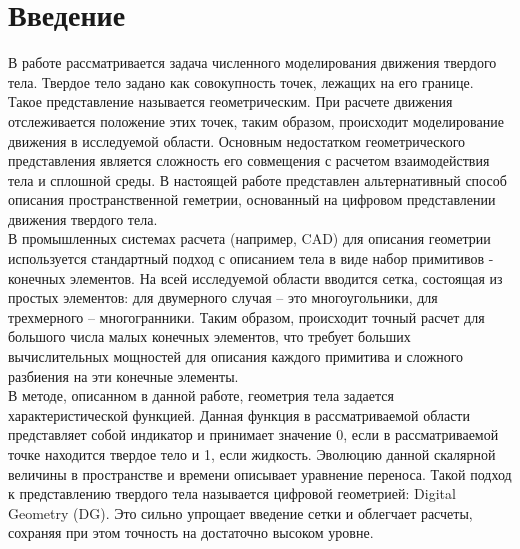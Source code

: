 \documentclass[12pt,a4paper]{article}
\begin{document}
\newpage
\tableofcontents


\newpage

\section{Введение}
В работе рассматривается задача численного моделирования движения твердого тела. Твердое тело задано как совокупность точек, лежащих на его границе. Такое представление называется геометрическим. При расчете движения отслеживается положение этих точек, таким образом, происходит моделирование движения в исследуемой области. Основным недостатком геометрического представления является сложность его совмещения с расчетом взаимодействия тела и сплошной среды. В настоящей работе представлен альтернативный способ описания пространственной геметрии, основанный на цифровом представлении движения твердого тела.\\
В промышленных системах расчета (например, CAD) для описания геометрии используется стандартный подход с описанием тела в виде набор примитивов - конечных элементов. На всей исследуемой области вводится сетка, состоящая из простых элементов: для двумерного случая – это многоугольники, для трехмерного – многогранники. Таким образом, происходит точный расчет для большого числа малых конечных элементов, что требует больших вычислительных мощностей для описания каждого примитива и сложного разбиения на эти конечные элементы.\\
В методе, описанном в данной работе, геометрия тела задается характеристической функцией. Данная функция в рассматриваемой области представляет собой индикатор и принимает значение 0, если в рассматриваемой точке находится твердое тело и 1, если жидкость. Эволюцию данной скалярной величины в пространстве и времени описывает уравнение переноса. Такой подход к представлению твердого тела называется цифровой геометрией: Digital Geometry (DG). Это сильно упрощает введение сетки и облегчает расчеты, сохраняя при этом точность на достаточно высоком уровне.\\
\end{document}
